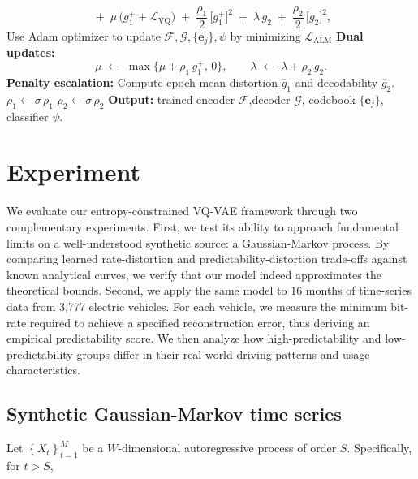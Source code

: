 \documentclass[12pt,review,authoryear]{elsarticle}
\theoremstyle{upright}
\begin{document}
\begin{algorithm}[t!]
\begin{algorithmic}[1]
\[                \;+\;
                \mu\,\bigl(g_1^+ + \mathcal{L}_{\mathrm{VQ}}\bigr)
                \;+\;
                \frac{\rho_1}{2}\,\bigl[g_1^+\bigr]^2
                \;+\;
                \lambda\,g_2
                \;+\;
                \frac{\rho_2}{2}\,\bigl[g_2\bigr]^2,
                \]
        \State  Use Adam optimizer to update \(\mathcal{F},\mathcal{G},\{\mathbf{e}_j\},\psi\) by minimizing \(\mathcal{L}_{\mathrm{ALM}}\) %
        \State \textbf{Dual updates:}  
          \[
            \mu \;\leftarrow\; \max\bigl\{\mu + \rho_1\,g_1^+,\,0\bigr\},
            \qquad
            \lambda \;\leftarrow\; \lambda + \rho_2\,g_2.
          \]
    \EndFor
        \State \textbf{Penalty escalation:} 
      Compute epoch‐mean distortion \(\overline{g}_{1}\) and decodability \(\overline{g}_{2}\).
        \(\rho_1 \leftarrow \sigma\,\rho_1\)  
      \EndIf  
        \(\rho_2 \leftarrow \sigma\,\rho_2\)  
      \EndIf  
\EndFor
\State \textbf{Output:} trained encoder $\mathcal{F}$,decoder $\mathcal{G}$,  codebook \(\{\mathbf{e}_j\}\), classifier \(\psi\).
\end{algorithmic}
\end{algorithm}


\section{Experiment}
\label{experiment}
We evaluate our entropy-constrained VQ-VAE framework through two complementary experiments. First, we test its ability to approach fundamental limits on a well-understood synthetic source: a Gaussian-Markov process. By comparing learned rate-distortion and predictability-distortion trade-offs against known analytical curves, we verify that our model indeed approximates the theoretical bounds. Second, we apply the same model to 16 months of time-series data from 3,777 electric vehicles. For each vehicle, we measure the minimum bit-rate required to achieve a specified reconstruction error, thus deriving an empirical predictability score. We then analyze how high-predictability and low-predictability groups differ in their real-world driving patterns and usage characteristics.


\subsection{Synthetic Gaussian-Markov time series}
\label{Synthetic Gaussian-Markov time series}
Let $\left\{X_t\right\}_{t=1}^M$ be a $W$-dimensional autoregressive process of order $S$. Specifically, for $t>S$,
\end{document}
